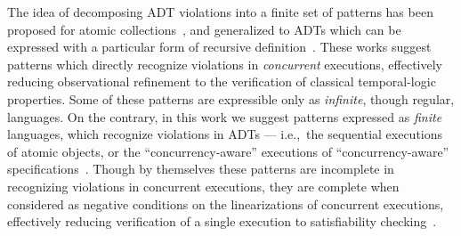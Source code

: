 The idea of decomposing ADT violations into a finite set of patterns has been
proposed for atomic collections~\cite{conf/tacas/AbdullaHHJR13,
conf/concur/HenzingerSV13, conf/popl/DoddsHK15, conf/popl/BouajjaniEEH15}, and
generalized to ADTs which can be expressed with a particular form of recursive
definition~\cite{journals/arxiv/BouajjaniEEH15}. These works suggest patterns
which directly recognize violations in \emph{concurrent} executions,
effectively reducing observational refinement to the verification of classical
temporal-logic properties. Some of these patterns are expressible only as
\emph{infinite}, though regular, languages. On the contrary, in this work we
suggest patterns expressed as \emph{finite} languages, which recognize
violations in ADTs — i.e.,~the sequential executions of atomic
objects, or the “concurrency-aware” executions of “concurrency-aware”
specifications~\cite{conf/podc/HemedR14}. Though by themselves these patterns
are incomplete in recognizing violations in concurrent executions, they are
complete when considered as negative conditions on the linearizations of
concurrent executions, effectively reducing verification of a single execution
to satisfiability checking~\cite{conf/pldi/EmmiEH15}.
